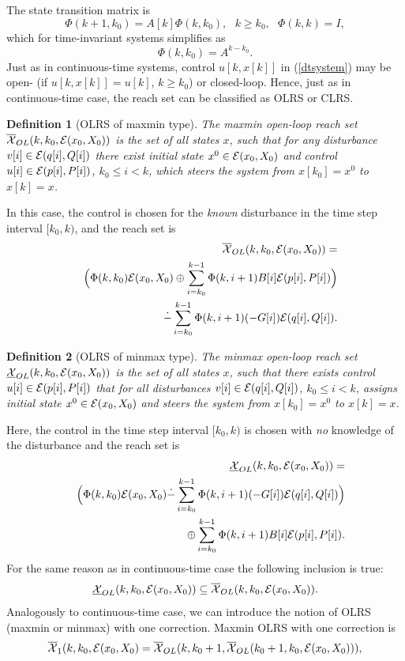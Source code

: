\documentclass{report}
\newtheorem{df}{Definition}[section]
\newcommand{\bd}{\begin{df}}
\newcommand{\ed}{\end{df}}
\newcommand{\EE}{{\cal E}}
\newcommand{\XX}{{\cal X}}
\begin{document}
The state transition matrix is
\[ \Phi(k+1,k_{0})=A[k]\Phi(k,k_{0}), ~~~ k\geq k_0, ~~~ \Phi(k,k)=I, \]
which for time-invariant systems simplifies as
\[ \Phi(k,k_{0})=A^{k-k_0}. \]
Just as in continuous-time systems, control $u[k, x[k]]$ in (\ref{dtsystem})
may be open- (if $u[k,x[k]] = u[k]$, $k\geq k_0$) or closed-loop.
Hence, just as in continuous-time case, the reach set can be classified as
OLRS or CLRS.
\bd[OLRS of maxmin type]
The maxmin open-loop reach set $\overline{\XX}_{OL}(k,k_0,\EE(x_0,X_0))$ is the set
of all states $x$, such that for any disturbance $v[i]\in\EE(q[i],Q[i])$ there
exist initial state $x^0\in\EE(x_0,X_0)$ and control $u[i]\in\EE(p[i],P[i])$,
$k_0\leq i<k$, which steers the system from $x[k_0]=x^0$ to $x[k]=x$.
\ed
In this case, the control is chosen for the \emph{known} disturbance in the
time step interval $[k_0, k)$, and the reach set is
\begin{eqnarray}
& & \overline{\XX}_{OL}(k,k_0,\EE(x_0,X_0)) = \nonumber \\
& & \Big{(}\Phi(k,k_0)\EE(x_0,X_0)\oplus
\sum_{i=k_0}^{k-1}\Phi(k,i+1)B[i]\EE(p[i],P[i])\Big{)} \nonumber \\
& & \dot{-} \sum_{i=k_0}^{k-1}\Phi(k,i+1)(-G[i])\EE(q[i],Q[i]).
\end{eqnarray}
\bd[OLRS of minmax type]
The minmax open-loop reach set $\underline{\XX}_{OL}(k,k_0,\EE(x_0,X_0))$ is the set
of all states $x$, such that there exists control $u[i]\in\EE(p[i],P[i])$ that
for all disturbances $v[i]\in\EE(q[i],Q[i])$, $k_0\leq i<k$, assigns initial
state $x^0\in\EE(x_0,X_0)$ and steers the system from $x[k_0]=x^0$ to
$x[k]=x$. 
\ed
Here, the control in the time step interval $[k_0,k)$ is chosen with \emph{no}
knowledge of the disturbance and the reach set is
\begin{eqnarray}
& & \underline{\XX}_{OL}(k,k_0,\EE(x_0,X_0)) = \nonumber \\
& & \Big{(}\Phi(k,k_0)\EE(x_0,X_0)\dot{-}
\sum_{i=k_0}^{k-1}\Phi(k,i+1)(-G[i])\EE(q[i],Q[i])\Big{)} \nonumber \\
& & \oplus
\sum_{i=k_0}^{k-1}\Phi(k,i+1)B[i]\EE(p[i],P[i]).
\end{eqnarray}
For the same reason as in continuous-time case the following inclusion is true:
\[ \underline{\XX}_{OL}(k,k_0,\EE(x_0,X_0)) \subseteq
\overline{\XX}_{OL}(k,k_0,\EE(x_0,X_0)) . \]
Analogously to continuous-time case, we can introduce the notion of OLRS
(maxmin or minmax) with one correction. Maxmin OLRS with one correction is
\[ \overline{\XX}_1(k,k_0,\EE(x_0,X_0) =
\overline{\XX}_{OL}(k,k_0+1,\overline{\XX}_{OL}(k_0+1,k_0,\EE(x_0,X_0))), \]
\end{document}
